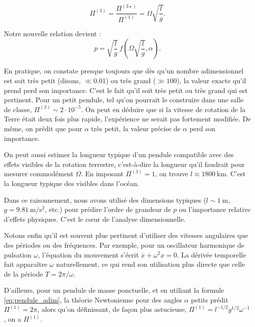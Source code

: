 \begin{displaymath}
  \Pi^{(3)} = \frac{\Pi^{(3\star)}}{\Pi^{(1)}} = \Omega \sqrt{\frac{l}{g}}.
\end{displaymath}

Notre nouvelle relation devient :
\begin{equation}
  p = \sqrt{\frac{l}{g}} \, f\left(\Omega \sqrt{\frac{l}{g}}, \alpha\right).
  \label{eq:grand_pendule}
\end{equation}

En pratique, on constate presque toujours que dès qu’un nombre adimensionnel est soit très petit (disons, $\ll 0.01$) ou très grand ($\gg 100$), la valeur exacte qu’il prend perd son importance. C’est le fait qu’il soit très petit ou très grand qui est pertinent. Pour un petit pendule, tel qu’on pourrait le construire dans une salle de classe, $\Pi^{(3)} \sim 2 \cdot 10^{-5}$. On peut en déduire que si la vitesse de rotation de la Terre était deux fois plus rapide, l’expérience ne serait pas fortement modifiée. De même, on prédit que pour $\alpha$ très petit, la valeur précise de $\alpha$ perd son importance. 

On peut aussi estimer la longueur typique d’un pendule compatible avec des effets visibles de la rotation terrestre, c’est-à-dire la longueur qu’il faudrait pour mesurer commodément $\Omega$. En imposant $\Pi^{(3)} = 1$, on trouve $l \approx 1800~\textrm{km}$. C’est la longueur typique des  visibles dans l’océan.

Dans ce raisonnement, nous avons utilisé des dimensions typiques ($l \sim 1~\textrm{m}$, $g = 9.81~\textrm{m}/\textrm{s}^2$, etc.) pour prédire l’ordre de grandeur de $p$ ou l’importance relative d’effets physiques. C’est le cœur de l’analyse dimensionnelle.

Notons enfin qu’il est souvent plus pertinent d’utiliser des vitesses angulaires que des périodes ou des fréquences. Par exemple, pour un oscillateur harmonique de pulsation $\omega$, l’équation du mouvement s’écrit $\ddot{x} + \omega^2 x = 0$. La dérivée temporelle fait apparaître $\omega$ naturellement, ce qui rend son utilisation plus directe que celle de la période $T = 2\pi/\omega$. 

D'ailleurs, pour un pendule de masse ponctuelle, et en utiliant la formule \eqref{eq:pendule_adim}, la théorie Newtonienne pour des angles $\alpha$ petits prédit $\Pi^{(1)}=2\pi$,  alors qu'on définissant, de façon plus astucieuse, $\Pi^{(1)}=l^{-1/2}g^{1/2}\omega^{-1}$, on a $\Pi^{(1)}$.

